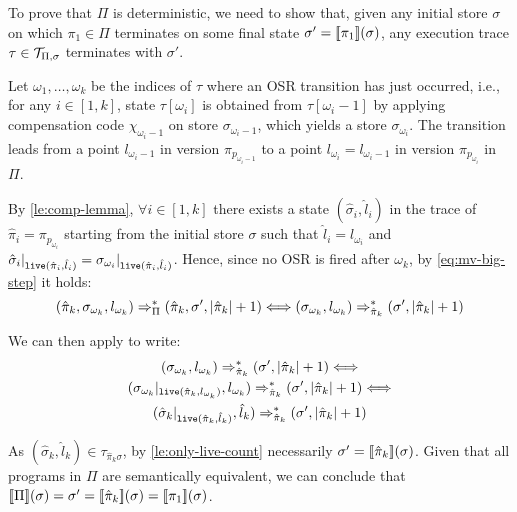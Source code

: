 \begin{myproof}
To prove that $\Pi$ is deterministic, we need to show that, given any initial store $\sigma$ on which $\pi_1\in\Pi$ terminates on some final state $\sigma'=[\![\pi_1]\!](\sigma)$, any execution trace $\tau\in{\cal T}_{\Pi,\sigma}$ terminates with $\sigma'$.

\noindent Let $\omega_1,\ldots,\omega_k$ be the indices of $\tau$ where an OSR transition has just occurred, i.e., for any $i\in[1,k]$, state $\tau[\omega_i]$ is obtained from $\tau[\omega_i-1]$ by applying compensation code $\chi_{\omega_i-1}$ on store $\sigma_{\omega_i-1}$, which yields a store $\sigma_{\omega_i}$. The transition leads from a point $l_{\omega_i-1}$ in version $\pi_{p_{\omega_i-1}}$ to a point $l_{\omega_i}=l_{\omega_i-1}$ in version $\pi_{p_{\omega_{i}}}$ in $\Pi$. 

By \mylemma\ref{le:comp-lemma}, $\forall i\in[1,k]$ there exists a state $(\hat{\sigma}_i,\hat{l}_i)$ in the trace of $\hat{\pi}_i=\pi_{p_{\omega_{i}}}$ starting from the initial store $\sigma$ such that $\hat{l}_i=l_{\omega_i}$ and $\hat{\sigma}_i\vert_{\text{${\tt live}$}(\hat{\pi}_i,\hat{l}_i)}=\sigma_{\omega_i}\vert_{\text{${\tt live}$}(\hat{\pi}_i,\hat{l}_i)}$. Hence, since no OSR is fired after $\omega_k$, by \myequation\ref{eq:mv-big-step} it holds: 
\begin{equation*}
(\hat{\pi}_k,\sigma_{\omega_{k}},l_{\omega_{k}})\Rightarrow^*_{\Pi}(\hat{\pi}_k,\sigma',|\hat{\pi}_k|+1) \Longleftrightarrow (\sigma_{\omega_{k}},l_{\omega_{k}})\Rightarrow^*_{\hat{\pi}_k}(\sigma',|\hat{\pi}_k|+1)
\end{equation*}

\noindent We can then apply  to write:
\begin{gather*}
(\sigma_{\omega_{k}},l_{\omega_{k}})\Rightarrow^*_{\hat{\pi}_k}(\sigma',|\hat{\pi}_k|+1) \Longleftrightarrow \\ 
(\sigma_{\omega_{k}}\vert_{\text{${\tt live}$}(\hat{\pi}_k,l_{\omega_{k}})},l_{\omega_{k}})\Rightarrow^*_{\hat{\pi}_k}(\sigma',|\hat{\pi}_k|+1) \Longleftrightarrow \\
(\hat{\sigma}_k\vert_{\text{${\tt live}$}(\hat{\pi}_k,\hat{l}_k)},\hat{l}_k)\Rightarrow^*_{\hat{\pi}_k}(\sigma',|\hat{\pi}_k|+1)
\end{gather*}

\noindent As $(\hat{\sigma}_k,\hat{l}_k)\in\tau_{\hat{\pi}_k\sigma}$, by \ref{le:only-live-count} necessarily $\sigma'=[\![\hat{\pi}_k]\!](\sigma)$. 
Given that all programs in $\Pi$ are semantically equivalent, we can conclude that $[\![\Pi]\!](\sigma)=\sigma'=[\![\hat{\pi}_k]\!](\sigma)=[\![\pi_1]\!](\sigma)$.
\end{myproof}


